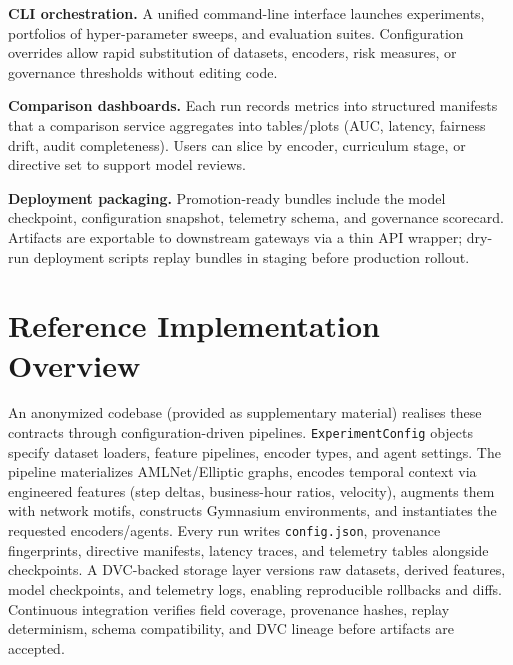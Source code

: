 \documentclass[letterpaper]{article}
\begin{document}
\textbf{CLI orchestration.}
A unified command-line interface launches experiments, portfolios of hyper-parameter sweeps, and evaluation suites. Configuration overrides allow rapid substitution of datasets, encoders, risk measures, or governance thresholds without editing code.

\textbf{Comparison dashboards.}
Each run records metrics into structured manifests that a comparison service aggregates into tables/plots (AUC, latency, fairness drift, audit completeness). Users can slice by encoder, curriculum stage, or directive set to support model reviews.

\textbf{Deployment packaging.}
Promotion-ready bundles include the model checkpoint, configuration snapshot, telemetry schema, and governance scorecard. Artifacts are exportable to downstream gateways via a thin API wrapper; dry-run deployment scripts replay bundles in staging before production rollout.

\section{Reference Implementation Overview}
\label{sec:implementation}
An anonymized codebase (provided as supplementary material) realises these contracts through configuration-driven pipelines. \texttt{ExperimentConfig} objects specify dataset loaders, feature pipelines, encoder types, and agent settings. The pipeline materializes AMLNet/Elliptic graphs, encodes temporal context via engineered features (step deltas, business-hour ratios, velocity), augments them with network motifs, constructs Gymnasium environments, and instantiates the requested encoders/agents. Every run writes \texttt{config.json}, provenance fingerprints, directive manifests, latency traces, and telemetry tables alongside checkpoints. A DVC-backed storage layer versions raw datasets, derived features, model checkpoints, and telemetry logs, enabling reproducible rollbacks and diffs. Continuous integration verifies field coverage, provenance hashes, replay determinism, schema compatibility, and DVC lineage before artifacts are accepted.
\end{document}
